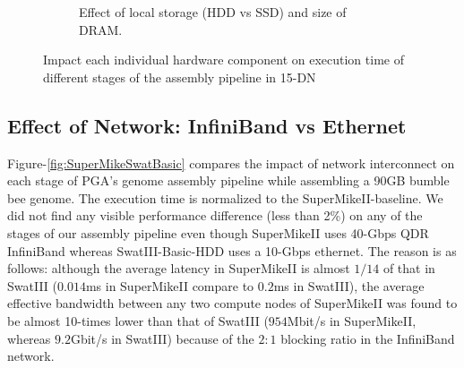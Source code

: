 \documentclass[conference]{IEEEtran}
\begin{document}
\begin{figure}[htb]
\begin{subfigure}[b]{0.23\textwidth}
                \caption{Effect of local storage (HDD vs SSD) and size of DRAM.}
                \label{fig:SuperMikeSwatStorageMemory}
   \end{subfigure}
   \caption{Impact each individual hardware component on execution time of different stages of the assembly pipeline in 15-DN }
  \label{fig:SuperMikeSwat}
  \vspace{-1.5em}
\end{figure}


\subsection {Effect of Network: InfiniBand vs Ethernet} \label{EffectOfNetwork}
Figure-\ref{fig:SuperMikeSwatBasic} compares the impact of network interconnect on each stage of PGA's genome assembly pipeline while assembling a 90GB bumble bee genome. 
The execution time is normalized to the SuperMikeII-baseline. %
We did not find any visible performance difference (less than 2\%) on any of the stages of our assembly pipeline even though SuperMikeII uses 40-Gbps QDR InfiniBand whereas SwatIII-Basic-HDD uses a 10-Gbps ethernet. 
The reason is as follows: 
although the average latency in SuperMikeII is almost $1/14$ of that in SwatIII ($0.014$ms in SuperMikeII compare to $0.2$ms in SwatIII), the average effective bandwidth between any two compute nodes of SuperMikeII was found to be almost 10-times lower than that of SwatIII ($954$Mbit/s in SuperMikeII, whereas $9.2$Gbit/s in SwatIII) because of the $2:1$ blocking ratio in the InfiniBand network. 
 
\end{document}
